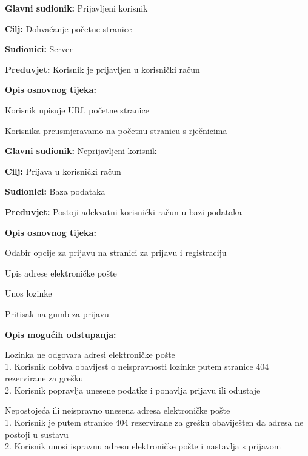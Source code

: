 					\noindent {}
					\begin{packed_item}
						\item \textbf{Glavni sudionik:} Prijavljeni korisnik
						\item \textbf{Cilj:} Dohvaćanje početne stranice
						\item \textbf{Sudionici:} Server
						\item \textbf{Preduvjet:} Korisnik je prijavljen u korisnički račun
						\item \textbf{Opis osnovnog tijeka:}
						\begin{packed_enum}
							\item Korisnik upisuje URL početne stranice
							\item Korisnika preusmjeravamo na početnu stranicu s rječnicima
						\end{packed_enum}
					\end{packed_item}


					\noindent \underbar{\textbf{UC2 Prijava u sustav}}
					\begin{packed_item}
						\item \textbf{Glavni sudionik:} Neprijavljeni korisnik
						\item \textbf{Cilj:} Prijava u korisnički račun
						\item \textbf{Sudionici:} Baza podataka
						\item \textbf{Preduvjet:} Postoji adekvatni korisnički račun u bazi podataka
						\item \textbf{Opis osnovnog tijeka:}
						\begin{packed_enum}
							\item Odabir opcije za prijavu na stranici za prijavu i registraciju
							\item Upis adrese elektroničke pošte
							\item Unos lozinke
							\item Pritisak na gumb za prijavu
						\end{packed_enum}
						\item \textbf{Opis mogućih odstupanja:}
						\begin{packed_item}
							\item[3.a] Lozinka ne odgovara adresi elektroničke pošte
							\\1. Korisnik dobiva obavijest o neispravnosti lozinke putem stranice 404 rezervirane za grešku
							\\2. Korisnik popravlja unesene podatke i ponavlja prijavu ili odustaje
							\item[2.a] Nepostojeća ili neispravno unesena adresa elektroničke pošte
							\\1. Korisnik  je putem stranice 404 rezervirane za grešku obaviješten da adresa ne postoji u sustavu
							\\2. Korisnik unosi ispravnu adresu elektroničke pošte i nastavlja s prijavom
						\end{packed_item}
					\end{packed_item}
					
